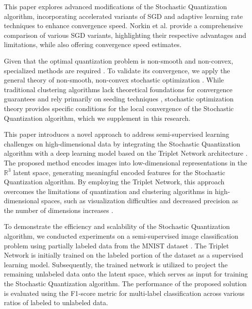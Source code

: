 This paper explores advanced modifications of the Stochastic Quantization algorithm, incorporating accelerated variants of SGD \cite{nesterov1983method,Poliak_1987,walkington_2023} and adaptive learning rate techniques \cite{Duchi_2011,kingma2017adam,tieleman2012rmsprop} to enhance convergence speed. Norkin et al. \cite{Norkin_Kozyriev_Norkin_2024} provide a comprehensive comparison of various SGD variants, highlighting their respective advantages and limitations, while also offering convergence speed estimates.

Given that the optimal quantization problem is non-smooth and non-convex, specialized methods are required \cite{Gandikota_Kane_Maity_Mazumdar_2022,Tang_2017,Zhao_Lan_Chen_Ngo_2021}. To validate its convergence, we apply the general theory of non-smooth, non-convex stochastic optimization \cite{Ermoliev_Norkin_2003,Ermolev_Norkin_1998,mikhalevich2024}. While traditional clustering algorithms lack theoretical foundations for convergence guarantees and rely primarily on seeding techniques \cite{Arthur_Vassilvitskii_2007}, stochastic optimization theory provides specific conditions for the local convergence of the Stochastic Quantization algorithm, which we supplement in this research.

This paper introduces a novel approach to address semi-supervised learning challenges on high-dimensional data by integrating the Stochastic Quantization algorithm with a deep learning model based on the Triplet Network architecture \cite{Hoffer_2015}. The proposed method encodes images into low-dimensional representations in the $\mathbb{R}^3$ latent space, generating meaningful encoded features for the Stochastic Quantization algorithm. By employing the Triplet Network, this approach overcomes the limitations of quantization and clustering algorithms in high-dimensional spaces, such as visualization difficulties and decreased precision as the number of dimensions increases \cite{Kriegel_Kröger_Zimek_2009}.

To demonstrate the efficiency and scalability of the Stochastic Quantization algorithm, we conducted experiments on a semi-supervised image classification problem using partially labeled data from the MNIST dataset \cite{lecun2010mnist}. The Triplet Network is initially trained on the labeled portion of the dataset as a supervised learning model. Subsequently, the trained network is utilized to project the remaining unlabeled data onto the latent space, which serves as input for training the Stochastic Quantization algorithm. The performance of the proposed solution is evaluated using the F1-score metric \cite{Chinchor_1992} for multi-label classification across various ratios of labeled to unlabeled data.
